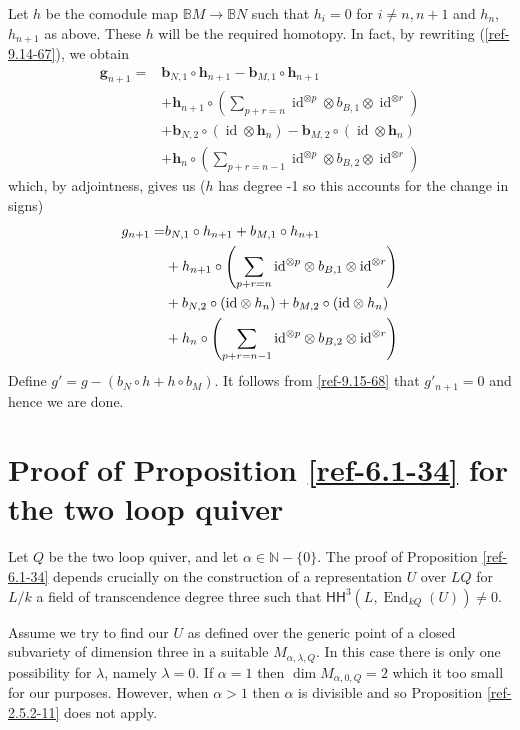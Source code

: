 \documentclass{amsart}
\numberwithin{equation}{section}
\let\blb\mathbb
\theoremstyle{definition}
\theoremstyle{remark}
\begin{document}
Let $h$ be the comodule map ${\mathbb{B}} M{\rightarrow} {\mathbb{B}} N$ such that $h_i=0$ for $i\neq n,n+1$ and $h_n$, $h_{n+1}$ as above.
 These $h$  will be the required homotopy. In fact, by rewriting (\ref{ref-9.14-67}), we obtain  
\begin{align*}
\textbf{g}_{n+1}=&\textbf{b}_{N,1}\circ \textbf{h}_{n+1} - \textbf{b}_{M,1}\circ \textbf{h}_{n+1} \\
&+\textbf{h}_{n+1}\circ \left( \sum_{p+r=n} {{\operatorname {id}}}^{\otimes p}\otimes b_{B,1}\otimes {{\operatorname {id}}}^{\otimes r}\right) \\
&+\textbf{b}_{N,2}\circ({{\operatorname {id}}}\otimes \textbf{h}_{n}) -\textbf{b}_{M,2}\circ ({{\operatorname {id}}}\otimes \textbf{h}_{n})   \\
&+\textbf{h}_{n}\circ \left( \sum_{p+r=n-1} {{\operatorname {id}}}^{\otimes p}\otimes b_{B,2}\otimes {{\operatorname {id}}}^{\otimes r} \right)
\end{align*}
which, by adjointness, gives us ($h$ has degree -1 so this accounts for the change in signs)
\begin{align}\label{ref-9.15-68}
g_{n+1}=&b_{N,1}\circ h_{n+1} + b_{M,1}\circ h_{n+1} \\
&+h_{n+1}\circ \left( \sum_{p+r=n} {{\operatorname {id}}}^{\otimes p}\otimes b_{B,1}\otimes {{\operatorname {id}}}^{\otimes r}\right) \notag\\
&+b_{N,2}\circ({{\operatorname {id}}}\otimes h_{n}) +b_{M,2}\circ ({{\operatorname {id}}}\otimes h_{n})   \notag\\
&+h_{n}\circ \left( \sum_{p+r=n-1} {{\operatorname {id}}}^{\otimes p}\otimes b_{B,2}\otimes {{\operatorname {id}}}^{\otimes r} \right) \notag
\end{align}
Define $g'=g-(b_N\circ h+h\circ b_M)$. It follows from \eqref{ref-9.15-68} that $g'_{n+1}=0$ and hence we are done. {}
\appendix
\section{Proof of Proposition \ref{ref-6.1-34} for the two loop quiver}
\label{ref-A-69}
Let $Q$ be the two loop quiver, and let $\alpha\in {{\blb N}}-\{0\}$. The proof of Proposition
\ref{ref-6.1-34} depends crucially on the construction of a representation $U$ over
$LQ$ for $L/k$ a field of transcendence degree three such that ${\mathsf{HH}}^3(L,{\operatorname {End}}_{kQ}(U))\neq 0$.

Assume we try to find our $U$ as defined over the generic point of a closed
subvariety of dimension three in a suitable $M_{\alpha,\lambda,Q}$.
In this case there is only one possibility
for $\lambda$, namely $\lambda=0$. If $\alpha=1$ then $\dim M_{\alpha,0,Q}=2$  which it too small
for our purposes. However, when $\alpha>1$ then $\alpha$ is divisible and so Proposition
\ref{ref-2.5.2-11} does not apply.
\end{document}
